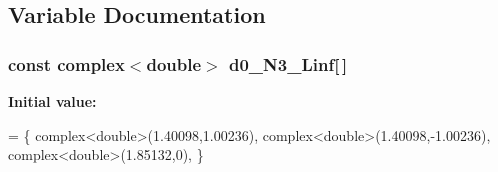 \subsection{Variable Documentation}
\subsubsection[{\texorpdfstring{d0\+\_\+\+N3\+\_\+\+Linf}{d0_N3_Linf}}]{\setlength{\rightskip}{0pt plus 5cm}const complex$<$double$>$ d0\+\_\+\+N3\+\_\+\+Linf\mbox{[}$\,$\mbox{]}}\label{IIRGausDeriv_8cpp_a8c8a923a255f7d1433ccbb5ca69e6848}
{\bfseries Initial value\+:}
\begin{DoxyCode}
= \{
    complex<double>(1.40098,1.00236),
    complex<double>(1.40098,-1.00236),
    complex<double>(1.85132,0),
\}
\end{DoxyCode}

